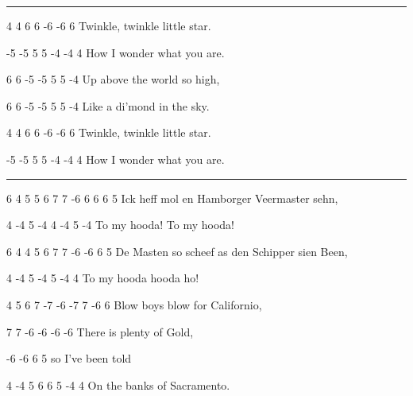 \documentclass[a4paper,12pt]{article}
\begin{document}
\pagestyle{empty}
\renewcommand*\contentsname{My Harp Book \hfill \normalfont \today}
\tableofcontents
{}
\newpage
\pagestyle{fancy}
\setcounter{page}{1}

\noindent\rule{\columnwidth}{1pt}
\begin{lstsong}
4   4    6   6  -6 -6   6
Twinkle, twinkle little star.

-5 -5  5  5  -4   -4   4
How I wonder what you are.

6  6 -5  -5    5    5 -4
Up above the world so high,

 6   6 -5  -5  5  5   -4
Like a di'mond in the sky.

 4   4    6  6   -6 -6    6
Twinkle, twinkle little star.

-5 -5  5 5   -4    -4  4      
How I wonder what you are.
\end{lstsong}
\newpage


\noindent\rule{\columnwidth}{1pt}
\begin{lstsong}
6 4 5 5 6 7 7 -6 6 6 6 5
Ick heff mol en Hamborger Veermaster sehn,

4 -4 5 -4 4 -4 5 -4
To my hooda! To my hooda!

6 4 4 5 6 7 7 -6 -6 6 5
De Masten so scheef as den Schipper sien Been,

4 -4 5 -4 5 -4 4
 To my hooda hooda ho!

4 5 6 7 -7 -6 -7 7 -6 6
Blow boys blow for Californio,

7 7 -6 -6 -6 -6
There is plenty of Gold,

-6 -6 6 5
so I've been told

4 -4 5 6 6 5 -4 4
On the banks of Sacramento.
\end{lstsong}
\newpage
\end{document}
